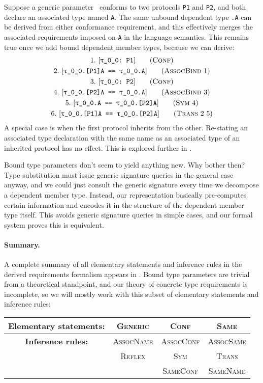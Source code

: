 \documentclass[../generics]{subfiles}
\begin{document}
Suppose a generic parameter \rT\ conforms to two protocols \texttt{P1} and \texttt{P2}, and both declare an associated type named \texttt{A}. The same unbound dependent type \texttt{\rT.A} can be derived from either conformance requirement, and this effectively merges the associated requirements imposed on \texttt{A} in the language semantics. This remains true once we add bound dependent member types, because we can derive:
\begin{gather*}
\ConfStep{\rT}{P1}{1}\\
\AssocBindStep{1}{\rT.[P1]A}{\rT.A}{2}\\
\ConfStep{\rT}{P2}{3}\\
\AssocBindStep{3}{\rT.[P2]A}{\rT.A}{4}\\
\SymStep{4}{\rT.A}{\rT.[P2]A}{5}\\
\TransStep{2}{5}{\rT.[P1]A}{\rT.[P2]A}{6}
\end{gather*}
A special case is when the first protocol inherits from the other. Re-stating an associated type declaration with the same name as an associated type of an inherited protocol has no effect. This is explored further in .

Bound type parameters don't seem to yield anything new. Why bother then? Type substitution must issue generic signature queries in the general case anyway, and we could just consult the generic signature every time we decompose a dependent member type. Instead, our representation basically pre-computes certain information and encodes it in the structure of the dependent member type itself. This avoids generic signature queries in simple cases, and our formal system proves this is equivalent. 

\paragraph{Summary.}
A complete summary of all elementary statements and inference rules in the derived requirements formalism appears in . Bound type parameters are trivial from a theoretical standpoint, and our theory of concrete type requirements is incomplete, so we will mostly work with this subset of elementary statements and inference rules:
\begin{center}
\begin{tabular}{cccc}
\toprule
\textbf{Elementary statements:}&\textsc{Generic}&\textsc{Conf}&\textsc{Same}\\
\midrule
\textbf{Inference rules:}&\textsc{AssocName}&\textsc{AssocConf}&\textsc{AssocSame}\\
&\textsc{Reflex}&\textsc{Sym}&\textsc{Trans}\\
&&\textsc{SameConf}&\textsc{SameName}\\
\bottomrule
\end{tabular}
\end{center}
\end{document}
